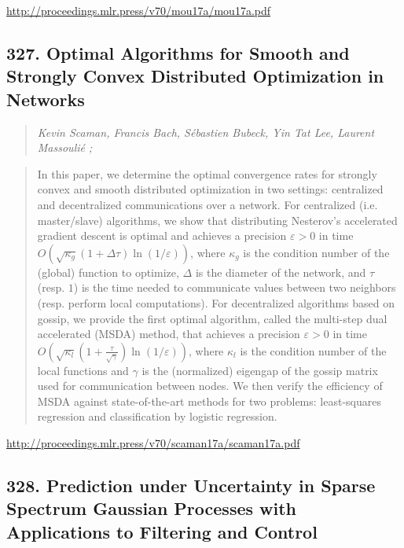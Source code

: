 \documentclass{article}
\begin{document}
\href{http://proceedings.mlr.press/v70/mou17a/mou17a.pdf}{http://proceedings.mlr.press/v70/mou17a/mou17a.pdf}

\subsection{327. Optimal Algorithms for Smooth and Strongly Convex Distributed Optimization in Networks}

\begin{quote}
\footnotesize{\textit{Kevin Scaman, Francis Bach, Sébastien Bubeck, Yin Tat Lee, Laurent Massoulié ;}}

\end{quote}

\begin{quote}
    In this paper, we determine the optimal convergence rates for strongly convex and smooth distributed optimization in two settings: centralized and decentralized communications over a network. For centralized (i.e. master/slave) algorithms, we show that distributing Nesterov’s accelerated gradient descent is optimal and achieves a precision $\varepsilon > 0$ in time $O(\sqrt{\kappa_g}(1+\Delta\tau)\ln(1/\varepsilon))$, where $\kappa_g$ is the condition number of the (global) function to optimize, $\Delta$ is the diameter of the network, and $\tau$ (resp. $1$) is the time needed to communicate values between two neighbors (resp. perform local computations). For decentralized algorithms based on gossip, we provide the first optimal algorithm, called the multi-step dual accelerated (MSDA) method, that achieves a precision $\varepsilon > 0$ in time $O(\sqrt{\kappa_l}(1+\frac{\tau}{\sqrt{\gamma}})\ln(1/\varepsilon))$, where $\kappa_l$ is the condition number of the local functions and $\gamma$ is the (normalized) eigengap of the gossip matrix used for communication between nodes. We then verify the efficiency of MSDA against state-of-the-art methods for two problems: least-squares regression and classification by logistic regression.  
\end{quote}

\href{http://proceedings.mlr.press/v70/scaman17a/scaman17a.pdf}{http://proceedings.mlr.press/v70/scaman17a/scaman17a.pdf}

\subsection{328. Prediction under Uncertainty in Sparse Spectrum Gaussian Processes with Applications to Filtering and Control}
\end{document}
